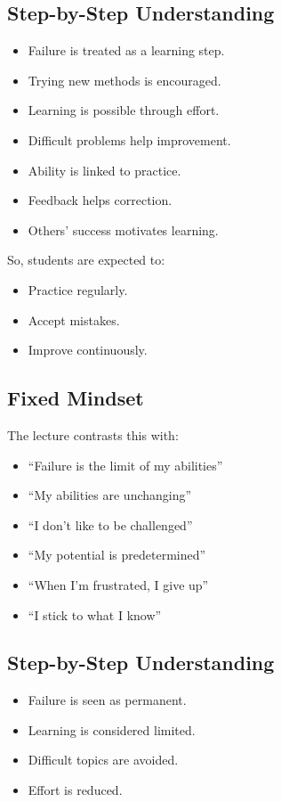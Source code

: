 \documentclass[12pt]{article}
\begin{document}
\subsection*{Step-by-Step Understanding}

\begin{itemize}
\item Failure is treated as a learning step.
\item Trying new methods is encouraged.
\item Learning is possible through effort.
\item Difficult problems help improvement.
\item Ability is linked to practice.
\item Feedback helps correction.
\item Others’ success motivates learning.
\end{itemize}

So, students are expected to:

\begin{itemize}
\item Practice regularly.
\item Accept mistakes.
\item Improve continuously.
\end{itemize}

\subsection{Fixed Mindset}

The lecture contrasts this with:

\begin{itemize}
\item ``Failure is the limit of my abilities''
\item ``My abilities are unchanging''
\item ``I don’t like to be challenged''
\item ``My potential is predetermined''
\item ``When I’m frustrated, I give up''
\item ``I stick to what I know''
\end{itemize}

\subsection*{Step-by-Step Understanding}

\begin{itemize}
\item Failure is seen as permanent.
\item Learning is considered limited.
\item Difficult topics are avoided.
\item Effort is reduced.
\end{itemize}
\end{document}
